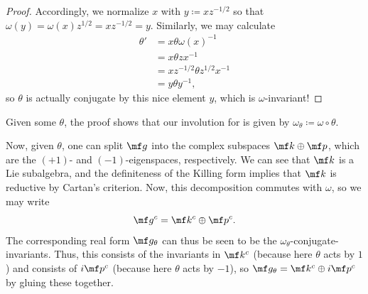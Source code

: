 \documentclass[../notes.tex]{subfiles}
\begin{document}
\begin{proof}
	Accordingly, we normalize $x$ with $y\coloneqq xz^{-1/2}$ so that $\omega(y)=\omega(x)z^{1/2}=xz^{-1/2}=y$. Similarly, we may calculate
	\begin{align*}
		\theta' &= x\theta\omega(x)^{-1} \\
		&= x\theta zx^{-1} \\
		&= xz^{-1/2}\theta z^{1/2}x^{-1} \\
		&= y\theta y^{-1},
	\end{align*}
	so $\theta$ is actually conjugate by this nice element $y$, which is $\omega$-invariant!
\end{proof}
\begin{remark}
	Given some $\theta$, the proof shows that our involution for  is given by $\omega_\theta\coloneqq\omega\circ\theta$.
\end{remark}
\begin{remark} \label{rem:get-g-theta}
	Now, given $\theta$, one can split $\mf g$ into the complex subspaces $\mf k\oplus\mf p$, which are the $(+1)$- and $(-1)$-eigenspaces, respectively. We can see that $\mf k$ is a Lie subalgebra, and the definiteness of the Killing form implies that $\mf k$ is reductive by Cartan's criterion. Now, this decomposition commutes with $\omega$, so we may write
	\[\mf g^c=\mf k^c\oplus\mf p^c.\]
	The corresponding real form $\mf g_\theta$ can thus be seen to be the $\omega_\theta$-conjugate-invariants. Thus, this consists of the invariants in $\mf k^c$ (because here $\theta$ acts by $1$) and consists of $i\mf p^c$ (because here $\theta$ acts by $-1$), so $\mf g_\theta=\mf k^c\oplus i\mf p^c$ by gluing these together.
\end{remark}
\end{document}
